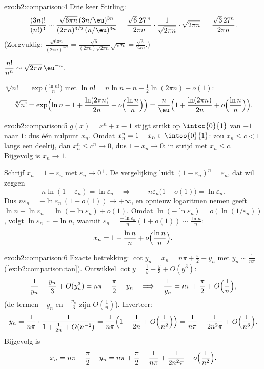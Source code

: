 \begin{solution}{exo:b2:comparison:4}
Drie keer Stirling:
\[
\frac{(3n)!}{(n!)^3}
\sim \frac{\sqrt{6\pi n}\,(3n/\eu)^{3n}}
{(2\pi n)^{3/2}\,(n/\eu)^{3n}}
= \frac{\sqrt{6}\; 27^{\,n}}{2\pi n} \cdot
\frac{1}{\sqrt{2\pi n}}\cdot\sqrt{2\pi n}\;
= \frac{\sqrt3\,27^n}{2\pi n} .
\]
(Zorgvuldig: $\frac{\sqrt{6\pi n}}{(2\pi n)^{3/2}} =
\frac{\sqrt6}{(2\pi n)\sqrt{2\pi n}}\sqrt{\pi n} =
\frac{\sqrt3}{2\pi n}$.)

$\dfrac{n!}{n^n} \sim \sqrt{2\pi n}\,\eu^{-n}$.

$\sqrt[n]{n!} = \exp\bigl(\frac{\ln n!}{n}\bigr)$ met $\ln n! =
n\ln n - n + \frac12\ln(2\pi n) + o(1)$:
\[
\sqrt[n]{n!} = \exp\Bigl(\ln n - 1 + \frac{\ln(2\pi n)}{2n} +
o\Bigl(\frac{\ln n}{n}\Bigr)\Bigr)
= \frac{n}{\eu}\Bigl(1 + \frac{\ln(2\pi n)}{2n} +
o\Bigl(\frac{\ln n}{n}\Bigr)\Bigr).
\]
\end{solution}

\begin{solution}{exo:b2:comparison:5}
$g(x) = x^n + x - 1$ stijgt strikt op $\intcc{0}{1}$ van $-1$ naar
$1$: dus één nulpunt $x_n$. Omdat $x_n^n = 1 - x_n \in
\intoo{0}{1}$: zou $x_n \leq c < 1$ langs een deelrij, dan $x_n^n
\leq c^n \to 0$, dus $1 - x_n \to 0$: in strijd met $x_n \leq c$.
Bijgevolg is $x_n \to 1$.

Schrijf $x_n = 1 - \varepsilon_n$ met $\varepsilon_n \to 0^+$. De
vergelijking luidt $(1 - \varepsilon_n)^n = \varepsilon_n$, dat wil
zeggen
\[
n\ln(1 - \varepsilon_n) = \ln \varepsilon_n
\quad\Longrightarrow\quad
-n\varepsilon_n\bigl(1 + o(1)\bigr) = \ln\varepsilon_n .
\]
Dus $n\varepsilon_n = -\ln\varepsilon_n\,(1 + o(1)) \to +\infty$,
en opnieuw logaritmen nemen geeft $\ln n + \ln\varepsilon_n =
\ln(-\ln\varepsilon_n) + o(1)$. Omdat $\ln(-\ln \varepsilon_n) =
o(\ln(1/\varepsilon_n))$, volgt $\ln\varepsilon_n \sim -\ln n$,
waaruit $\varepsilon_n = \frac{-\ln\varepsilon_n}{n}(1 + o(1))
\sim \frac{\ln n}{n}$:
\[
x_n = 1 - \frac{\ln n}{n} + o\Bigl(\frac{\ln n}{n}\Bigr) .
\]
\end{solution}

\begin{solution}{exo:b2:comparison:6}
Exacte betrekking: $\cot y_n = x_n = n\pi + \frac\pi2 - y_n$ met
$y_n \sim \frac{1}{n\pi}$ (\cref{ex:b2:comparison:tan}). Ontwikkel
$\cot y = \frac1y - \frac y3 + O(y^3)$:
\[
\frac{1}{y_n} - \frac{y_n}{3} + O(y_n^3) = n\pi + \frac\pi2 - y_n
\quad\Longrightarrow\quad
\frac{1}{y_n} = n\pi + \frac\pi2 + O\Bigl(\frac1n\Bigr),
\]
(de termen $-y_n$ en $-\frac{y_n}{3}$ zijn $O(\frac1n)$). Inverteer:
\[
y_n = \frac{1}{n\pi}\cdot\frac{1}{1 + \frac{1}{2n} + O(n^{-2})}
= \frac{1}{n\pi}\Bigl(1 - \frac{1}{2n} + O\Bigl(\frac{1}{n^2}\Bigr)\Bigr)
= \frac{1}{n\pi} - \frac{1}{2n^2\pi} + O\Bigl(\frac{1}{n^3}\Bigr).
\]
Bijgevolg is
\[
x_n = n\pi + \frac{\pi}{2} - y_n
= n\pi + \frac\pi2 - \frac{1}{n\pi} + \frac{1}{2n^2\pi} +
o\Bigl(\frac{1}{n^2}\Bigr).
\]
\end{solution}

